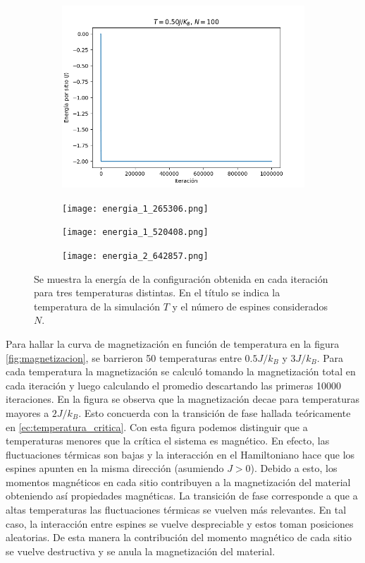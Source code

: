 \documentclass{article}
\begin{document}
\begin{figure}
\centering
\begin{subfigure}{0.49\textwidth}
\includegraphics[width=\textwidth]{energia_0_500000.png}
\end{subfigure}
\begin{subfigure}{0.49\textwidth}
\texttt{[image: energia\_1\_265306.png]}
\end{subfigure}
\begin{subfigure}{0.49\textwidth}
\texttt{[image: energia\_1\_520408.png]}
\end{subfigure}
\begin{subfigure}{0.49\textwidth}
\texttt{[image: energia\_2\_642857.png]}
\end{subfigure}
\caption{\label{fig:energia}Se muestra la energía de la configuración obtenida en cada iteración para tres temperaturas distintas. En el título se indica la temperatura de la simulación $T$ y el número de espines considerados $N$.}
\end{figure}

Para hallar la curva de magnetización en función de temperatura en la figura \ref{fig:magnetizacion}, se barrieron 50 temperaturas entre $0.5J/k_B$ y $3J/k_B$. Para cada temperatura la magnetización se calculó tomando la magnetización total en cada iteración y luego calculando el promedio descartando las primeras 10000 iteraciones. En la figura se observa que la magnetización decae para temperaturas mayores a $2J/k_B$. Esto concuerda con la transición de fase hallada teóricamente en \eqref{ec:temperatura_critica}. Con esta figura podemos distinguir que a temperaturas menores que la crítica el sistema es magnético. En efecto, las fluctuaciones térmicas son bajas y la interacción en el Hamiltoniano hace que los espines apunten en la misma dirección (asumiendo $J>0$). Debido a esto, los momentos magnéticos en cada sitio contribuyen a la magnetización del material obteniendo así propiedades magnéticas. La transición de fase corresponde a que a altas temperaturas las fluctuaciones térmicas se vuelven más relevantes. En tal caso, la interacción entre espines se vuelve despreciable y estos toman posiciones aleatorias. De esta manera la contribución del momento magnético de cada sitio se vuelve destructiva y se anula la magnetización del material. 
\end{document}

